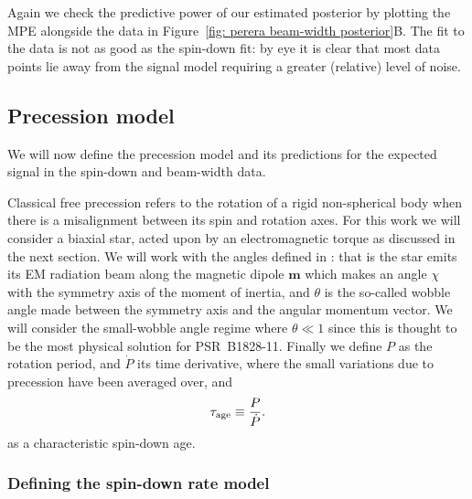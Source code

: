 \documentclass[../full_thesis/full_thesis.tex]{subfiles}
\begin{document}
Again we check the predictive power of our estimated posterior by plotting the
MPE alongside the data in Figure~\ref{fig: perera beam-width posterior}B. The fit
to the data is not as good as the spin-down fit: by eye it is clear that most
data points lie away from the signal model requiring a greater (relative) level
of noise.

\subsection{Precession model}
\label{sec: The precession model}

We will now define the precession model and its predictions for the expected
signal in the spin-down and beam-width data.

Classical free precession refers to the rotation of a rigid non-spherical body
when there is a misalignment between its spin and rotation axes. For this work
we will consider a biaxial star, acted upon by an electromagnetic torque as
discussed in the next section. We will work with the angles defined in
\citet{Jones2001}: that is the star emits its EM radiation beam along the magnetic
dipole $\mathbf{m}$ which makes an angle $\chi$ with the symmetry axis of the
moment of inertia, and $\theta$ is the so-called wobble angle made between the
symmetry axis and the angular momentum vector. We will consider the
small-wobble angle regime where $\theta \ll 1$ since this is thought to be the
most physical solution for PSR~B1828-11.  Finally we define $P$ as the rotation
period, and $\dot P$ its time derivative, where the small variations due to
precession have been averaged over, and
\begin{align}
    \tau_{\mathrm{age}} \equiv  \frac{P}{\dot P}.
\end{align}
as a characteristic spin-down age.

\subsubsection{Defining the spin-down rate model}
\end{document}
